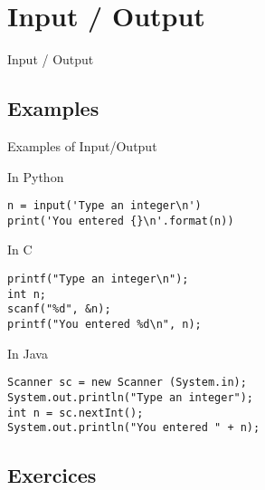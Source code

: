 
\section{Input / Output}

\begin{frame}{}
  \Large
  \centering
  \color{bleu}
  Input / Output
\end{frame}

\subsection{Examples}

\begin{frame}[fragile]{Examples of Input/Output}
  
  \begin{block}{In Python}
    \begin{lstlisting}[style=codePy]
n = input('Type an integer\n')
print('You entered {}\n'.format(n))
    \end{lstlisting}
  \end{block}
  
  \begin{block}{In C}
    \begin{lstlisting}[style=codeC]
printf("Type an integer\n");
int n;
scanf("%d", &n);
printf("You entered %d\n", n);
    \end{lstlisting}
  \end{block}
  
  \begin{block}{In Java}
    \begin{lstlisting}[style=codeJ]
Scanner sc = new Scanner (System.in);
System.out.println("Type an integer");
int n = sc.nextInt();
System.out.println("You entered " + n);
    \end{lstlisting}
  \end{block}
  
\end{frame}


\subsection{Exercices}